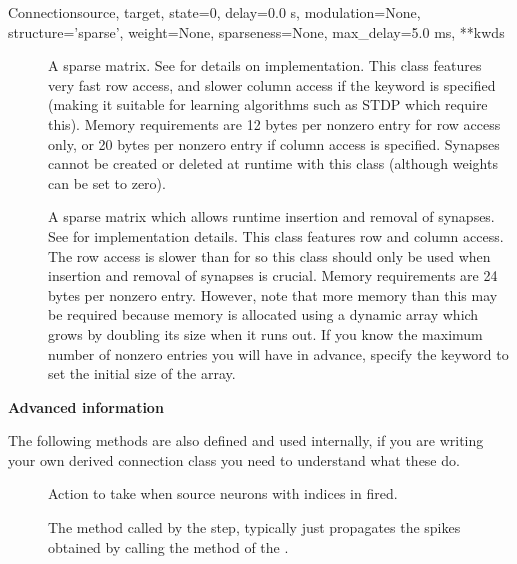 \documentclass[letterpaper,10pt,english]{manual}
\begin{document}
\begin{classdesc}{Connection}{source, target, state=0, delay=0.0 s, modulation=None, structure='sparse', weight=None, sparseness=None, max\_delay=5.0 ms, **kwds}
\begin{description}
\item[]
A sparse matrix. See \hyperlink{brian.SparseConnectionMatrix}{} for
details on implementation. This class features very fast row
access, and slower column access if the 
keyword is specified (making it suitable for learning
algorithms such as STDP which require this). Memory
requirements are 12 bytes per nonzero entry for row access
only, or 20 bytes per nonzero entry if column access is
specified. Synapses cannot be created or deleted at runtime
with this class (although weights can be set to zero).

\item[]
A sparse matrix which allows runtime insertion and removal
of synapses. See \hyperlink{brian.DynamicConnectionMatrix}{} for
implementation details. This class features row and column
access. The row access is slower than for  so this
class should only be used when insertion and removal of
synapses is crucial. Memory requirements are 24 bytes per
nonzero entry. However, note that more memory than this
may be required because memory is allocated using a
dynamic array which grows by doubling its size when it runs
out. If you know the maximum number of nonzero entries you will
have in advance, specify the  keyword to set the
initial size of the array.

\end{description}

\textbf{Advanced information}

The following methods are also defined and used internally, if you are
writing your own derived connection class you need to understand what
these do.
\begin{description}
\item[]
Action to take when source neurons with indices in 
fired.

\item[]
The method called by the \hyperlink{brian.Network}{}  step,
typically just propagates the spikes obtained by calling
the  method of the  \hyperlink{brian.NeuronGroup}{}.

\end{description}
\end{classdesc}
\end{document}
